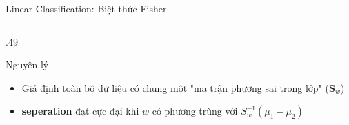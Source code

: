 \begin{frame}[shrink=40]{Linear Classification: Biệt thức Fisher}
\begin{columns}[T]
\begin{column}{.49\textwidth}
            \begin{alertblock}{Nguyên lý}
                \begin{itemize}
                    \item Giả định toàn bộ dữ liệu có chung một "ma trận phương sai trong lớp" ($\textbf{S}_w$)
                    \item \textbf{seperation} đạt cực đại khi $w$ có phương trùng với $S_w^{-1}(\mu_1 - \mu_2)$
                \end{itemize}
            \end{alertblock}
        \end{column}
    \end{columns}
\end{frame}

